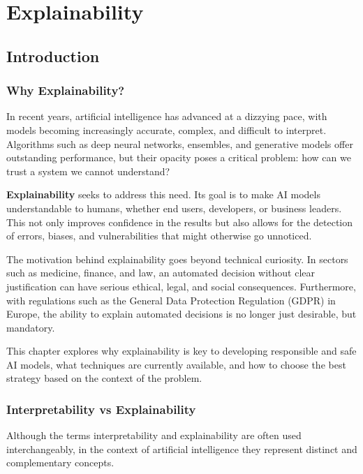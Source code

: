 \chapter{Explainability}

\section{Introduction}

\subsection{Why Explainability?}

In recent years, artificial intelligence has advanced at a dizzying pace, with models becoming increasingly accurate, complex, and difficult to interpret. Algorithms such as deep neural networks, ensembles, and generative models offer outstanding performance, but their opacity poses a critical problem: how can we trust a system we cannot understand?

\textbf{Explainability} seeks to address this need. Its goal is to make AI models understandable to humans, whether end users, developers, or business leaders. This not only improves confidence in the results but also allows for the detection of errors, biases, and vulnerabilities that might otherwise go unnoticed.

The motivation behind explainability goes beyond technical curiosity. In sectors such as medicine, finance, and law, an automated decision without clear justification can have serious ethical, legal, and social consequences. Furthermore, with regulations such as the General Data Protection Regulation (GDPR) in Europe, the ability to explain automated decisions is no longer just desirable, but mandatory.

This chapter explores why explainability is key to developing responsible and safe AI models, what techniques are currently available, and how to choose the best strategy based on the context of the problem.

\subsection{Interpretability vs Explainability}

Although the terms interpretability and explainability are often used interchangeably, in the context of artificial intelligence they represent distinct and complementary concepts.

